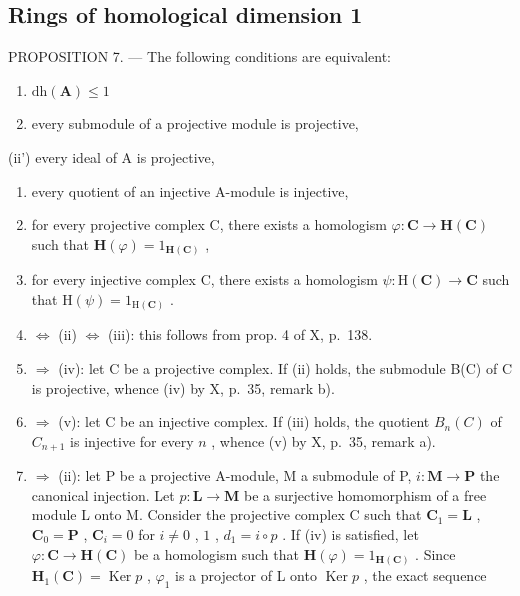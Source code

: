 \subsection{Rings of homological dimension 1}

PROPOSITION 7. --- The following conditions are equivalent:

\begin{enumerate}
\def\labelenumi{(\roman{enumi})}
\item
  \(\mathrm{dh}(\mathbf{A})\leqslant 1\)
\item
  every submodule of a projective module is projective,
\end{enumerate}

(ii') every ideal of A is projective,

\begin{enumerate}
\def\labelenumi{(\roman{enumi})}
\setcounter{enumi}{2}
\item
  every quotient of an injective A-module is injective,
\item
  for every projective complex C, there exists a homologism \(\varphi : \mathbf{C} \to \mathbf{H}(\mathbf{C})\) such that \(\mathbf{H}(\varphi) = 1_{\mathbf{H}(\mathbf{C})}\) ,
\item
  for every injective complex C, there exists a homologism \(\psi : \mathrm{H}(\mathbf{C}) \to \mathbf{C}\) such that \(\mathrm{H}(\psi) = 1_{\mathrm{H}(\mathbf{C})}\) .
\item
  \(\Leftrightarrow\) (ii) \(\Leftrightarrow\) (iii): this follows from prop. 4 of X, p.~138.
\item
  \(\Rightarrow\) (iv): let C be a projective complex. If (ii) holds, the submodule B(C) of C is projective, whence (iv) by X, p.~35, remark b).
\item
  \(\Rightarrow\) (v): let C be an injective complex. If (iii) holds, the quotient \(B_{n}(C)\) of \(C_{n+1}\) is injective for every \(n\) , whence (v) by X, p.~35, remark a).
\item
  \(\Rightarrow\) (ii): let P be a projective A-module, M a submodule of P, \(i: \mathbf{M} \to \mathbf{P}\) the canonical injection. Let \(p: \mathbf{L} \to \mathbf{M}\) be a surjective homomorphism of a free module L onto M. Consider the projective complex C such that \(\mathbf{C}_1 = \mathbf{L}\) , \(\mathbf{C}_0 = \mathbf{P}\) , \(\mathbf{C}_i = 0\) for \(i \neq 0\) , \(1\) , \(d_1 = i \circ p\) . If (iv) is satisfied, let \(\varphi: \mathbf{C} \to \mathbf{H}(\mathbf{C})\) be a homologism such that \(\mathbf{H}(\varphi) = 1_{\mathbf{H}(\mathbf{C})}\) . Since \(\mathbf{H}_1(\mathbf{C}) = \operatorname{Ker} p\) , \(\varphi_1\) is a projector of L onto \(\operatorname{Ker} p\) , the exact sequence
\end{enumerate}


